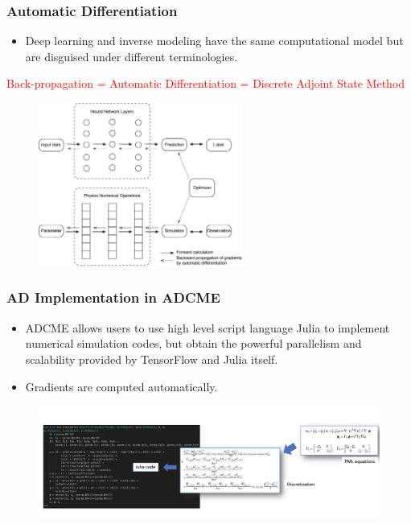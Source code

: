 \documentclass{beamer}
\begin{document}
\begin{frame}
	\frametitle{Automatic Differentiation}
	\begin{itemize}
		\item Deep learning and inverse modeling have the same computational model but are disguised under different terminologies.
	\end{itemize}
	\begin{center}
	\small
	\textcolor{red}{
		Back-propagation = Automatic Differentiation = Discrete Adjoint State Method}
	\end{center}
	\begin{figure}[hbt]
  \includegraphics[width=0.6\textwidth]{../compare-NN-PDE.png}
\end{figure}
\end{frame}

\begin{frame}
	\frametitle{AD Implementation in ADCME}
	\begin{itemize}
		\item ADCME allows users to use high level script language Julia to implement numerical simulation codes, but obtain the powerful parallelism and scalability provided by TensorFlow and Julia itself.
		\item Gradients are computed automatically. 
	\end{itemize}
	\begin{figure}[hbt]
  \includegraphics[width=1.0\textwidth]{../Julia.png}
\end{figure}
\end{frame}
\end{document}
